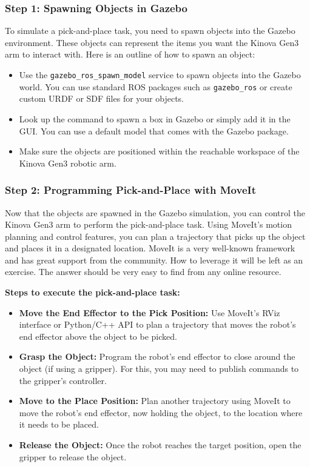 \documentclass{article}
\begin{document}
\subsubsection{Step 1: Spawning Objects in Gazebo}
To simulate a pick-and-place task, you need to spawn objects into the Gazebo environment. These objects can represent the items you want the Kinova Gen3 arm to interact with. Here is an outline of how to spawn an object:
\begin{itemize}
    \item Use the \texttt{gazebo\_ros\_spawn\_model} service to spawn objects into the Gazebo world. You can use standard ROS packages such as \texttt{gazebo\_ros} or create custom URDF or SDF files for your objects.
    \item Look up the command to spawn a box in Gazebo or simply add it in the GUI. You can use a default model that comes with the Gazebo package.
    \item Make sure the objects are positioned within the reachable workspace of the Kinova Gen3 robotic arm.
\end{itemize}

\subsubsection{Step 2: Programming Pick-and-Place with MoveIt}
Now that the objects are spawned in the Gazebo simulation, you can control the Kinova Gen3 arm to perform the pick-and-place task. Using MoveIt’s motion planning and control features, you can plan a trajectory that picks up the object and places it in a designated location. MoveIt is a very well-known framework and has great support from the community. How to leverage it will be left as an exercise. The answer should be very easy to find from any online resource.

\textbf{Steps to execute the pick-and-place task:}
\begin{itemize}
    \item \textbf{Move the End Effector to the Pick Position:} Use MoveIt’s RViz interface or Python/C++ API to plan a trajectory that moves the robot’s end effector above the object to be picked.
    \item \textbf{Grasp the Object:} Program the robot’s end effector to close around the object (if using a gripper). For this, you may need to publish commands to the gripper’s controller.
    \item \textbf{Move to the Place Position:} Plan another trajectory using MoveIt to move the robot’s end effector, now holding the object, to the location where it needs to be placed.
    \item \textbf{Release the Object:} Once the robot reaches the target position, open the gripper to release the object.
\end{itemize}
\end{document}
